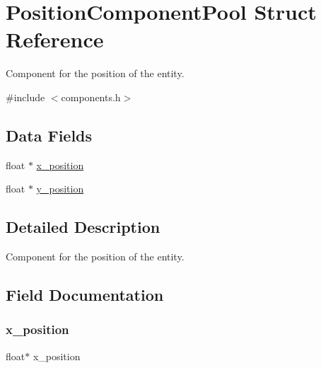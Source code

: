 \hypertarget{struct_position_component_pool}{}\section{Position\+Component\+Pool Struct Reference}
\label{struct_position_component_pool}


Component for the position of the entity.  




{\ttfamily \#include $<$components.\+h$>$}

\subsection*{Data Fields}
\begin{DoxyCompactItemize}
\item 
float $\ast$ \mbox{\hyperlink{struct_position_component_pool_af4eba642fe9ac912c7ee52aad45cdf68}{x\+\_\+position}}
\item 
float $\ast$ \mbox{\hyperlink{struct_position_component_pool_a5ea1dda60393a635fcad285a12677061}{y\+\_\+position}}
\end{DoxyCompactItemize}


\subsection{Detailed Description}
Component for the position of the entity. 

\subsection{Field Documentation}
\mbox{\label{struct_position_component_pool_af4eba642fe9ac912c7ee52aad45cdf68}} 
\subsubsection{\texorpdfstring{x\+\_\+position}{x\_position}}
{\footnotesize\ttfamily float$\ast$ x\+\_\+position}

\mbox{\label{struct_position_component_pool_a5ea1dda60393a635fcad285a12677061}} 
